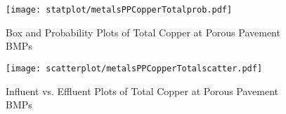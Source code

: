         \begin{figure}[hb]   %
            \centering
            \texttt{[image: statplot/metalsPPCopperTotalprob.pdf]}
            \caption{Box and Probability Plots of Total Copper at Porous Pavement BMPs}
        \end{figure}         %
        
        
        \begin{figure}[hb]   %
            \centering
            \texttt{[image: scatterplot/metalsPPCopperTotalscatter.pdf]}
            \caption{Influent vs. Effluent Plots of Total Copper at Porous Pavement BMPs}
        \end{figure}         %
        \clearpage
        